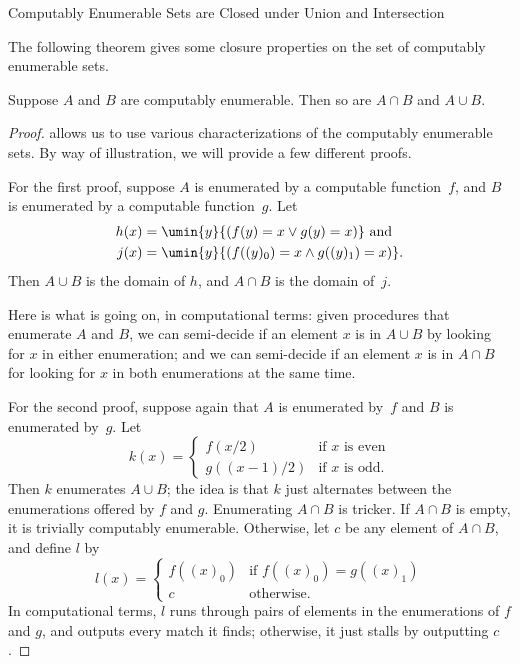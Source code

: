 \documentclass[../../../include/open-logic-section]{subfiles}
\begin{document}
  {Computably Enumerable Sets are Closed under Union and Intersection}

The following theorem gives some closure properties on the set of
computably enumerable sets.

\begin{thm}
Suppose $A$ and $B$ are computably enumerable. Then so are $A \cap B$
and $A \cup B$.
\end{thm}

\begin{proof}
 allows us to use various characterizations
of the computably enumerable sets. By way of illustration, we will
provide a few different proofs.

For the first proof, suppose $A$ is enumerated by a computable
function~$f$, and $B$ is enumerated by a computable function~$g$. Let
\begin{align*}
h(x) & = \umin{y}{(f(y) = x \lor g(y) = x)} \text{ and}\\
j(x) & = \umin{y}{(f((y)_0) = x \land g((y)_1) = x)}.
\end{align*}
Then $A \cup B$ is the domain of $h$, and $A \cap B$ is the domain
of~$j$.

\begin{explain}
Here is what is going on, in computational terms: given
procedures that enumerate $A$ and $B$, we can semi-decide if an
element $x$ is in $A \cup B$ by looking for $x$ in either enumeration;
and we can semi-decide if an element $x$ is in $A \cap B$ for looking
for $x$ in both enumerations at the same time.
\end{explain}

For the second proof, suppose again that $A$ is enumerated by~$f$ and
$B$ is enumerated by~$g$. Let
\[
k(x) = \begin{cases}
f(x/2) & \text{if $x$ is even} \\
g((x-1)/2) & \text{if $x$ is odd.}
\end{cases}
\]
Then $k$ enumerates $A \cup B$; the idea is that $k$ just alternates
between the enumerations offered by $f$ and $g$. Enumerating $A \cap
B$ is tricker. If $A \cap B$ is empty, it is trivially computably
enumerable. Otherwise, let $c$ be any element of $A \cap B$, and
define $l$ by
\[
l(x) = \begin{cases}
f((x)_0) & \text{if $f((x)_0) = g((x)_1)$} \\
c & \text{otherwise.}
\end{cases}
\]
In computational terms, $l$ runs through pairs of elements in the
enumerations of $f$ and $g$, and outputs every match it finds;
otherwise, it just stalls by outputting $c$.


\end{proof}
\end{document}
